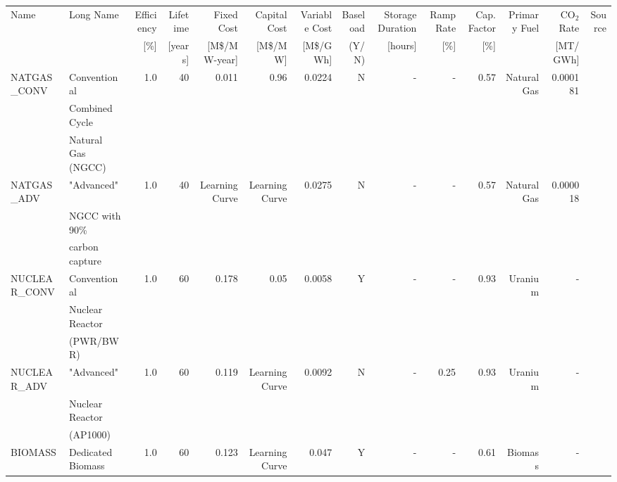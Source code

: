 \begin{tabular}{llrrrrrrrrrrrr}
\toprule
        Name &                                          Long Name &  Efficiency &  Lifetime & Fixed Cost & Capital Cost& Variable Cost & Baseload & Storage Duration & Ramp Rate & Cap. Factor & Primary Fuel &  CO$_2$ Rate & Source \\
        &  & [\%]  & [years] & [M\$/MW-year] & [M\$/MW] & [M\$/GWh] &(Y/N) & [hours] & [\%] & [\%] & & [MT/GWh] &  \\
\midrule
 NATGAS\_CONV &     Conventional   &         1.0 &        40 &                   0.011 &                    0.96 &                 0.0224 &               N &                      - &       - &                0.57 &  Natural Gas &                     0.000181 &   \cite{sargent__lundy_capital_2020}     \\
 &Combined Cycle&&&&&&&&&&&&\\
 &Natural Gas (NGCC)&&&&&&&&&&&&\\
  NATGAS\_ADV &            "Advanced"   &         1.0 &        40 &                      Learning Curve &                      Learning Curve &                 0.0275 &               N &                      - &       - &                0.57 &  Natural Gas &                     0.000018 &    \cite{nrel_2020_2020}    \\
  &NGCC with 90\%&&&&&&&&&&&&\\
  &carbon capture&&&&&&&&&&&&\\
NUCLEAR\_CONV &             Conventional   &         1.0 &        60 &                   0.178 &                    0.05 &                 0.0058 &               Y &                      - &       - &                0.93 &      Uranium &                     - &  \cite{desai_nuclear_2020,nei_status_2010}      \\
&Nuclear Reactor&&&&&&&&&&&&\\
&(PWR/BWR)&&&&&&&&&&&&\\
 NUCLEAR\_ADV &                "Advanced"   &         1.0 &        60 &                      0.119 &                      Learning Curve &                 0.0092 &               N &                      - &      0.25 &                0.93 &      Uranium &                     - &   \cite{nrel_2020_2020}     \\
 &Nuclear Reactor&&&&&&&&&&&&\\
 &(AP1000)&&&&&&&&&&&&\\
     BIOMASS &                            Dedicated Biomass  &         1.0 &        60 &                      0.123 &                      Learning Curve &                  0.047 &               Y &                      - &       - &                0.61 &      Biomass &                     - &       \cite{nrel_2020_2020} \\

\end{tabular}
